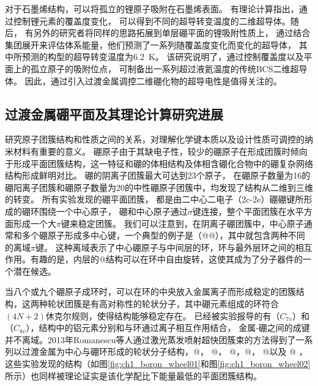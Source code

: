 对于石墨烯结构，可以将孤立的锂原子吸附在石墨烯表面。
有理论计算指出\cite{profeta2012phonon}，通过控制锂元素的覆盖度变化，
可以得到不同的超导转变温度的二维超导体。随后，
有另外的研究者\cite{wu2016lithium}将同样的思路拓展到单层硼平面的锂吸附性质上，
通过结合集团展开来评估体系能量，他们预测了一系列随覆盖度变化而变化的超导体，
其中所预测的构型的超导转变温度为\SI{6.2}{\kelvin}。 
该研究说明了，通过控制覆盖度以及平面上的孤立原子的吸附位点，
可制备出一系列超过液氦温度的传统BCS二维超导体。
因此，通过引入过渡金属调控二维硼化物的超导电性是值得关注的。

\subsection{过渡金属硼平面及其理论计算研究进展}
研究原子团簇结构和性质之间的关系，对理解化学键本质以及设计性质可调控的纳米材料有重要的意义。
硼原子由于其缺电子性，较少的硼原子在形成团簇时倾向于形成平面团簇结构\cite{xu2017practical}，这一特征和硼的体相结构及体相含硼化合物中的硼复杂网络结构形成鲜明对比。
硼的阴离子团簇最大可达到23个原子\cite{alexandrova2004molecular, alexandrova2004electronic, kiran2005planar, alexandrova2006all, sergeeva2008photoelectron, huang2010concentric, sergeeva2011all, piazza2012photoelectron, sergeeva2012b22, zhai2003hydrocarbon, zhai2003hepta}，
在硼原子数量为16的硼阳离子团簇和硼原子数量为20的中性硼原子团簇中，均发现了结构从二维到三维的转变\cite{kiran2005planar, tai2012structure, oger2007boron}。
所有实验发现的硼平面团簇\cite{romanescu2013transition}，
都是由二中心二电子（2c-2e）硼硼键所形成的硼环围绕一个中心原子，
硼和中心原子通过$\sigma$键连接，整个平面团簇在水平方面形成一个大$\pi$键来稳定团簇。
我们可以注意到，在阴离子硼团簇中，中心原子通常和多个硼原子形成多中心键，一个典型的例子是（@@）\cite{huang2010concentric}，其中就包含两种不同的离域$\pi$键。
这种离域表示了中心硼原子与中间层的环，环与最外层环之间的相互作用。有趣的是，内层的@结构可以在环中自由旋转，这使其成为了分子器件的一个潜在候选。

当八个或九个硼原子成环时，可以在环的中央放入金属离子而形成稳定的团簇结构，这两种轮状团簇是有高对称性的轮状分子，其中硼元素组成的环符合$(4N+2)$休克尔规则，使得结构能够稳定存在\cite{zhai2003hepta,alexandrova2004molecular}。
已经被实验报导的有（$C_{7v}$）和（$C_{8v}$）\cite{galeev2011valence}，结构中的铝元素分别和与环通过离子相互作用结合，
金属-硼之间的成键并不离域。2013年Romanescu等人通过激光蒸发喷射超快团簇束的方法得到了一系列以过渡金属为中心与硼环形成的轮状分子结构，@， @， @，@， @以及 @ \cite{romanescu2011aromatic,galeev2011valence,li2012transition}，
这些实验发现的结构（如图\ref{fig:ch1_boron_wheel01}和图\ref{fig:ch1_boron_wheel02}所示）也同样被理论证实是该化学配比下能量最低的平面团簇结构。

